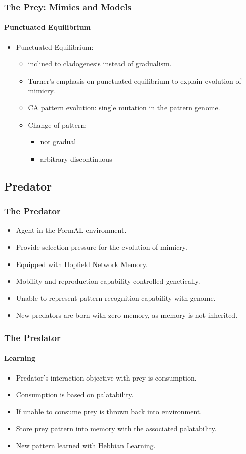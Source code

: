 \frame
{
	\frametitle{The Prey: Mimics and Models}
	\framesubtitle{Punctuated Equilibrium}
	
	\begin{itemize}
		\item Punctuated Equilibrium:
			\begin{itemize}
				\item inclined to cladogenesis instead of gradualism.
				\item Turner's emphasis on punctuated equilibrium to explain evolution of mimicry.
				\item CA pattern evolution: single mutation in the pattern genome.
				\item Change of pattern: 
					\begin{itemize}
						\item not gradual
						\item arbitrary discontinuous
					\end{itemize}
			\end{itemize}
	\end{itemize}
}

\subsection{Predator}

\frame
{
	\frametitle{The Predator}
	
	\begin{itemize}
		\item Agent in the FormAL environment.
		\item Provide selection pressure for the evolution of mimicry.
		\item Equipped with Hopfield Network Memory.
		\item Mobility and reproduction capability controlled genetically.
		\item Unable to represent pattern recognition capability with genome.
		\item New predators are born with zero memory, as memory is not inherited.
	\end{itemize}
}

\frame
{
	\frametitle{The Predator}
	\framesubtitle{Learning}

	\begin{itemize}
		\item Predator's interaction objective with prey is consumption.
		\item Consumption is based on palatability.
		\item If unable to consume prey is thrown back into environment.
		\item Store prey pattern into memory with the associated palatability.
		\item New pattern learned with Hebbian Learning.
	\end{itemize}
}

